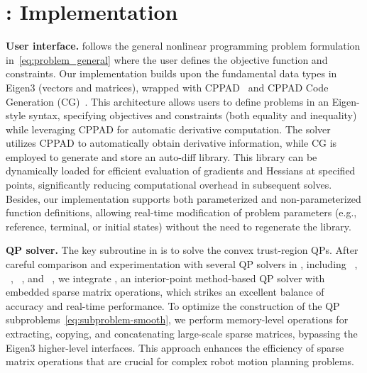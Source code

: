 \section{\crisp: Implementation}
\label{sec:implementation}

\textbf{User interface.}
\crisp follows the general nonlinear programming problem formulation in~\eqref{eq:problem_general} where the user defines the objective function and constraints. Our implementation builds upon the fundamental data types in Eigen3 (vectors and matrices), wrapped with CPPAD~\cite{cppad} and CPPAD Code Generation (CG)~\cite{cppadcg}. This architecture allows users to define problems in an Eigen-style syntax, specifying objectives and constraints (both equality and inequality) while leveraging CPPAD for automatic derivative computation.
The solver utilizes CPPAD to automatically obtain derivative information, while CG is employed to generate and store an auto-diff library. This library can be dynamically loaded for efficient evaluation of gradients and Hessians at specified points, significantly reducing computational overhead in subsequent solves. Besides, our implementation supports both parameterized and non-parameterized function definitions, allowing real-time modification of problem parameters (e.g., reference, terminal, or initial states) without the need to regenerate the library.


\textbf{QP solver.}
The key subroutine in \crisp is to solve the convex trust-region QPs. After careful comparison and experimentation with several QP solvers in \crisp, including ~\cite{osqp}, ~\cite{proxqp}, ~\cite{qpOASES}, and ~\cite{schwan2023piqp}, we integrate , an interior-point method-based QP solver with embedded sparse matrix operations, which strikes an excellent balance of accuracy and real-time performance.
To optimize the construction of the QP subproblems~\eqref{eq:subproblem-smooth}, we perform memory-level operations for extracting, copying, and concatenating large-scale sparse matrices, bypassing the Eigen3 higher-level interfaces. This approach enhances the efficiency of sparse matrix operations that are crucial for complex robot motion planning problems.

